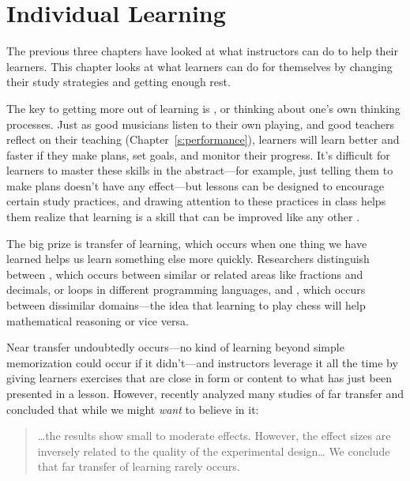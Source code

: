 \chapter{Individual Learning}\label{s:individual}

The previous three chapters have looked at what instructors can do to
help their learners. This chapter looks at what learners can do for
themselves by changing their study strategies and getting enough rest.

The key to getting more out of learning is
, or thinking about one's
own thinking processes. Just as good musicians listen to their own
playing, and good teachers reflect on their teaching
(Chapter~\ref{s:performance}), learners will learn better and faster if
they make plans, set goals, and monitor their progress. It's difficult
for learners to master these skills in the abstract---for example, just
telling them to make plans doesn't have any effect---but lessons can be
designed to encourage certain study practices, and drawing attention to
these practices in class helps them realize that learning is a skill
that can be improved like any other \cite{McGu2015,Miya2018}.

The big prize is transfer of learning, which occurs when one thing we
have learned helps us learn something else more quickly. Researchers
distinguish between , which occurs
between similar or related areas like fractions and decimals, or loops
in different programming languages, and , which occurs between dissimilar
domains---the idea that learning to play chess will help mathematical
reasoning or vice versa.

Near transfer undoubtedly occurs---no kind of learning beyond simple
memorization could occur if it didn't---and instructors leverage it all
the time by giving learners exercises that are close in form or content
to what has just been presented in a lesson. However, \cite{Sala2017}
recently analyzed many studies of far transfer and concluded that while
we might \emph{want} to believe in it:

\begin{quote}

\ldots{}the results show small to moderate effects. However, the
effect sizes are inversely related to the quality of the experimental
design\ldots{} We conclude that far transfer of learning rarely
occurs.

\end{quote}

